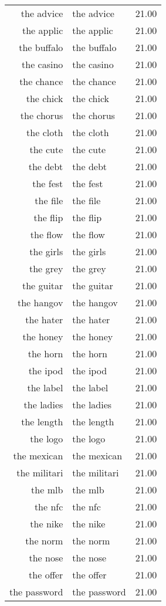 \begin{table}[ht]
\begin{tabular}{rlr}
  the advice & the advice & 21.00 \\ 
  the applic & the applic & 21.00 \\ 
  the buffalo & the buffalo & 21.00 \\ 
  the casino & the casino & 21.00 \\ 
  the chance & the chance & 21.00 \\ 
  the chick & the chick & 21.00 \\ 
  the chorus & the chorus & 21.00 \\ 
  the cloth & the cloth & 21.00 \\ 
  the cute & the cute & 21.00 \\ 
  the debt & the debt & 21.00 \\ 
  the fest & the fest & 21.00 \\ 
  the file & the file & 21.00 \\ 
  the flip & the flip & 21.00 \\ 
  the flow & the flow & 21.00 \\ 
  the girls & the girls & 21.00 \\ 
  the grey & the grey & 21.00 \\ 
  the guitar & the guitar & 21.00 \\ 
  the hangov & the hangov & 21.00 \\ 
  the hater & the hater & 21.00 \\ 
  the honey & the honey & 21.00 \\ 
  the horn & the horn & 21.00 \\ 
  the ipod & the ipod & 21.00 \\ 
  the label & the label & 21.00 \\ 
  the ladies & the ladies & 21.00 \\ 
  the length & the length & 21.00 \\ 
  the logo & the logo & 21.00 \\ 
  the mexican & the mexican & 21.00 \\ 
  the militari & the militari & 21.00 \\ 
  the mlb & the mlb & 21.00 \\ 
  the nfc & the nfc & 21.00 \\ 
  the nike & the nike & 21.00 \\ 
  the norm & the norm & 21.00 \\ 
  the nose & the nose & 21.00 \\ 
  the offer & the offer & 21.00 \\ 
  the password & the password & 21.00 \\ 

\end{tabular}
\end{table}
